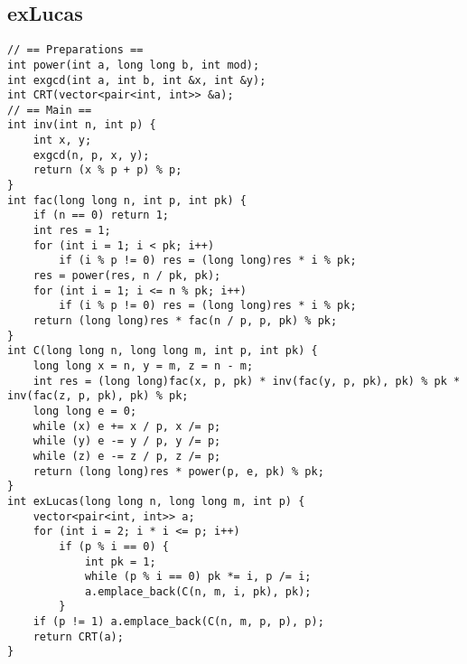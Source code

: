 \subsection{exLucas}

\begin{verbatim}
// == Preparations ==
int power(int a, long long b, int mod);
int exgcd(int a, int b, int &x, int &y);
int CRT(vector<pair<int, int>> &a);
// == Main ==
int inv(int n, int p) {
    int x, y;
    exgcd(n, p, x, y);
    return (x % p + p) % p;
}
int fac(long long n, int p, int pk) {
    if (n == 0) return 1;
    int res = 1;
    for (int i = 1; i < pk; i++)
        if (i % p != 0) res = (long long)res * i % pk;
    res = power(res, n / pk, pk);
    for (int i = 1; i <= n % pk; i++)
        if (i % p != 0) res = (long long)res * i % pk;
    return (long long)res * fac(n / p, p, pk) % pk;
}
int C(long long n, long long m, int p, int pk) {
    long long x = n, y = m, z = n - m;
    int res = (long long)fac(x, p, pk) * inv(fac(y, p, pk), pk) % pk * inv(fac(z, p, pk), pk) % pk;
    long long e = 0;
    while (x) e += x / p, x /= p;
    while (y) e -= y / p, y /= p;
    while (z) e -= z / p, z /= p;
    return (long long)res * power(p, e, pk) % pk;
}
int exLucas(long long n, long long m, int p) {
    vector<pair<int, int>> a;
    for (int i = 2; i * i <= p; i++)
        if (p % i == 0) {
            int pk = 1;
            while (p % i == 0) pk *= i, p /= i;
            a.emplace_back(C(n, m, i, pk), pk);
        }
    if (p != 1) a.emplace_back(C(n, m, p, p), p);
    return CRT(a);
}
\end{verbatim}